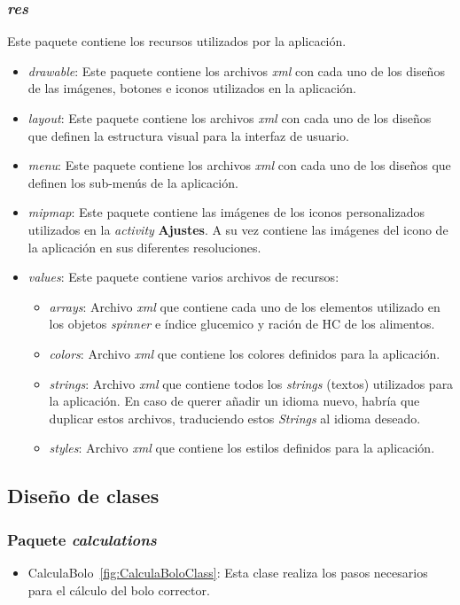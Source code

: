 \subsubsection{\textit{res}}\label{sssec:res}
Este paquete contiene los recursos utilizados por la aplicación.
\begin{itemize}
	\item \textit{drawable}: Este paquete contiene los archivos \textit{xml} con cada uno de los diseños de las imágenes, botones e iconos utilizados en la aplicación. 
	\item \textit{layout}: Este paquete contiene los archivos \textit{xml} con cada uno de los diseños que definen la estructura visual para la interfaz de usuario.
	\item \textit{menu}: Este paquete contiene los archivos \textit{xml} con cada uno de los diseños que definen los sub-menús de la aplicación.
	\item \textit{mipmap}:  Este paquete contiene las imágenes de los iconos personalizados utilizados en la \textit{activity} \textbf{Ajustes}. A su vez contiene las imágenes del icono de la aplicación en sus diferentes resoluciones.
	\item \textit{values}: Este paquete contiene varios archivos de recursos:
	\begin{itemize}
		\item \textit{arrays}: Archivo \textit{xml} que contiene cada uno de los elementos utilizado en los objetos \textit{spinner} e índice glucemico y ración de HC de los alimentos.
		\item \textit{colors}: Archivo \textit{xml} que contiene los colores definidos para la aplicación.
		\item \textit{strings}: Archivo \textit{xml} que contiene todos los \textit{strings} (textos) utilizados para la aplicación. En caso de querer añadir un idioma nuevo, habría que duplicar estos archivos, traduciendo estos \textit{Strings} al idioma deseado.
		\item \textit{styles}: Archivo \textit{xml} que contiene los estilos definidos para la aplicación.
	\end{itemize}
\end{itemize}
\subsection{Diseño de clases}
\subsubsection{Paquete \textit{calculations}}
\begin{itemize}
	\item CalculaBolo~\ref{fig:CalculaBoloClass}: Esta clase realiza los pasos necesarios para el cálculo del bolo corrector.
\end{itemize}
